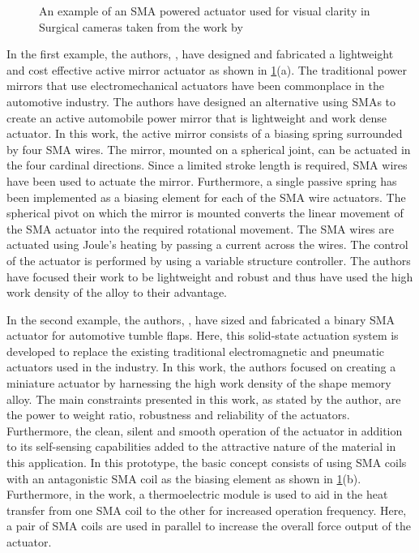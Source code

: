 \begin{figure}[hbt!]
    \centering
    
    \caption{An example of an SMA powered actuator used for visual clarity in Surgical cameras taken from the work by \todocite}
    \label{fig:auto-examples}
\end{figure}

In the first example, the authors, \todocite, have designed and fabricated a lightweight and cost effective active mirror actuator as shown in \cref{fig:auto-examples}(a). The traditional power mirrors that use electromechanical actuators have been commonplace in the automotive industry. The authors have designed an alternative using SMAs to create an active automobile power mirror that is lightweight and work dense actuator. In this work, the active mirror consists of a biasing spring surrounded by four SMA wires. The mirror, mounted on a spherical joint, can be actuated in the four cardinal directions. Since a limited stroke length is required, SMA wires have been used to actuate the mirror. Furthermore, a single passive spring has been implemented as a biasing element for each of the SMA wire actuators. The spherical pivot on which the mirror is mounted converts the linear movement of the SMA actuator into the required rotational movement. The SMA wires are actuated using Joule's heating by passing a current across the wires. The control of the actuator is performed by using a variable structure controller. The authors have focused their work to be lightweight and robust and thus have used the high work density of the alloy to their advantage.

In the second example, the authors, \todocite, have sized and fabricated a binary SMA actuator for automotive tumble flaps. Here, this solid-state actuation system is developed to replace the existing traditional electromagnetic and pneumatic actuators used in the industry. In this work, the authors focused on creating a miniature actuator by harnessing the high work density of the shape memory alloy. The main constraints presented in this work, as stated by the author, are the power to weight ratio, robustness and reliability of the actuators. Furthermore, the clean, silent and smooth operation of the actuator in addition to its self-sensing capabilities added to the attractive nature of the material in this application. In this prototype, the basic concept consists of using SMA coils with an antagonistic SMA coil as the biasing element as shown in \cref{fig:auto-examples}(b). Furthermore, in the work, a thermoelectric module is used to aid in the heat transfer from one SMA coil to the other for increased operation frequency. Here, a pair of SMA coils are used in parallel to increase the overall force output of the actuator.

